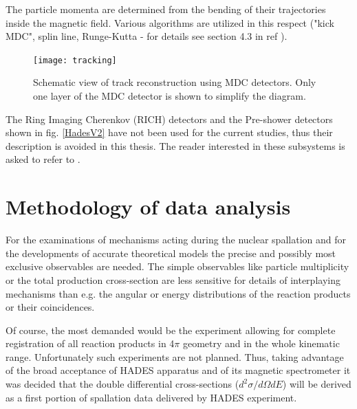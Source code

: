 The particle momenta are determined from the bending of their trajectories inside the magnetic field. Various algorithms 
are utilized in this respect ("kick MDC", splin line, Runge-Kutta - for details see section 4.3 in ref \cite{agakichiev2009HADES}). 

\begin{figure}[!ht]
	\centering
	\texttt{[image: tracking]}
	\caption{Schematic view of track reconstruction using MDC detectors. Only one layer of the MDC detector is shown to  simplify the diagram.  }
	\label{tracking}
\end{figure}
 
 
The Ring Imaging Cherenkov (RICH) detectors and the Pre-shower detectors shown in fig. \ref{HadesV2} have not been used for the current studies, 
thus their description is avoided in this thesis. The reader interested in these subsystems is asked to refer to \cite{agakichiev2009HADES}.

\section{\label{Analysis} Methodology of data analysis}

For the examinations of mechanisms acting during the nuclear spallation and for the developments of accurate theoretical models  
the precise and possibly most exclusive observables are needed.
The simple observables like particle multiplicity or the total production cross-section are less sensitive for details 
of interplaying mechanisms than e.g. the angular or energy distributions of the reaction products or their coincidences.

Of course, the most demanded would be the experiment allowing for complete registration of all reaction products 
in 4$\pi$ geometry and in the whole kinematic range. Unfortunately such experiments are not planned. 
Thus, taking advantage of the broad acceptance of HADES apparatus and of its magnetic spectrometer 
it was decided that the double differential cross-sections ($d^2\sigma/d\Omega dE$) will be derived as a 
first portion of spallation data delivered by HADES experiment. 

